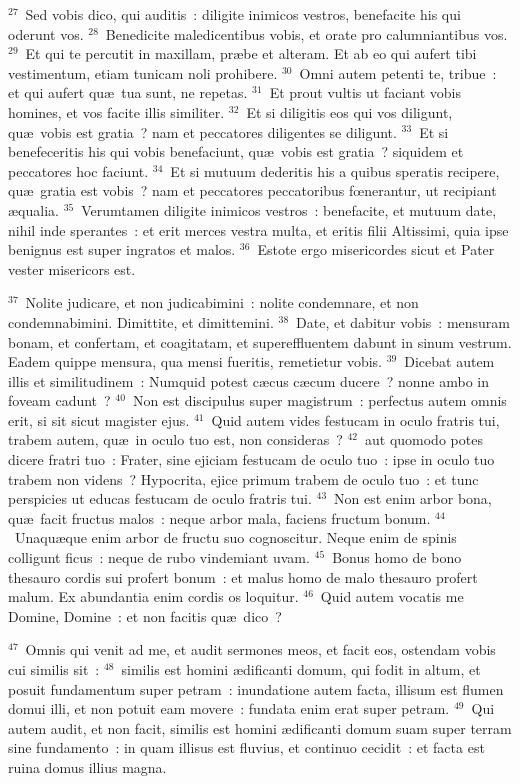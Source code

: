 ${}^{27}$~Sed vobis dico, qui auditis~: diligite inimicos vestros, benefacite his qui oderunt vos.
${}^{28}$~Benedicite maledicentibus vobis, et orate pro calumniantibus vos.
${}^{29}$~Et qui te percutit in maxillam, pr\ae be et alteram. Et ab eo qui aufert tibi vestimentum, etiam tunicam noli prohibere.
${}^{30}$~Omni autem petenti te, tribue~: et qui aufert qu\ae\ tua sunt, ne repetas.
${}^{31}$~Et prout vultis ut faciant vobis homines, et vos facite illis similiter.
${}^{32}$~Et si diligitis eos qui vos diligunt, qu\ae\ vobis est gratia~? nam et peccatores diligentes se diligunt.
${}^{33}$~Et si benefeceritis his qui vobis benefaciunt, qu\ae\ vobis est gratia~? siquidem et peccatores hoc faciunt.
${}^{34}$~Et si mutuum dederitis his a quibus speratis recipere, qu\ae\ gratia est vobis~? nam et peccatores peccatoribus fœnerantur, ut recipiant \ae qualia.
${}^{35}$~Verumtamen diligite inimicos vestros~: benefacite, et mutuum date, nihil inde sperantes~: et erit merces vestra multa, et eritis filii Altissimi, quia ipse benignus est super ingratos et malos.
${}^{36}$~Estote ergo misericordes sicut et Pater vester misericors est.


${}^{37}$~Nolite judicare, et non judicabimini~: nolite condemnare, et non condemnabimini. Dimittite, et dimittemini.
${}^{38}$~Date, et dabitur vobis~: mensuram bonam, et confertam, et coagitatam, et supereffluentem dabunt in sinum vestrum. Eadem quippe mensura, qua mensi fueritis, remetietur vobis.
${}^{39}$~Dicebat autem illis et similitudinem~: Numquid potest c\ae cus c\ae cum ducere~? nonne ambo in foveam cadunt~?
${}^{40}$~Non est discipulus super magistrum~: perfectus autem omnis erit, si sit sicut magister ejus.
${}^{41}$~Quid autem vides festucam in oculo fratris tui, trabem autem, qu\ae\ in oculo tuo est, non consideras~?
${}^{42}$~aut quomodo potes dicere fratri tuo~: Frater, sine ejiciam festucam de oculo tuo~: ipse in oculo tuo trabem non videns~? Hypocrita, ejice primum trabem de oculo tuo~: et tunc perspicies ut educas festucam de oculo fratris tui.
${}^{43}$~Non est enim arbor bona, qu\ae\ facit fructus malos~: neque arbor mala, faciens fructum bonum.
${}^{44}$~Unaqu\ae que enim arbor de fructu suo cognoscitur. Neque enim de spinis colligunt ficus~: neque de rubo vindemiant uvam.
${}^{45}$~Bonus homo de bono thesauro cordis sui profert bonum~: et malus homo de malo thesauro profert malum. Ex abundantia enim cordis os loquitur.
${}^{46}$~Quid autem vocatis me Domine, Domine~: et non facitis qu\ae\ dico~?


${}^{47}$~Omnis qui venit ad me, et audit sermones meos, et facit eos, ostendam vobis cui similis sit~:
${}^{48}$~similis est homini \ae dificanti domum, qui fodit in altum, et posuit fundamentum super petram~: inundatione autem facta, illisum est flumen domui illi, et non potuit eam movere~: fundata enim erat super petram.
${}^{49}$~Qui autem audit, et non facit, similis est homini \ae dificanti domum suam super terram sine fundamento~: in quam illisus est fluvius, et continuo cecidit~: et facta est ruina domus illius magna.

